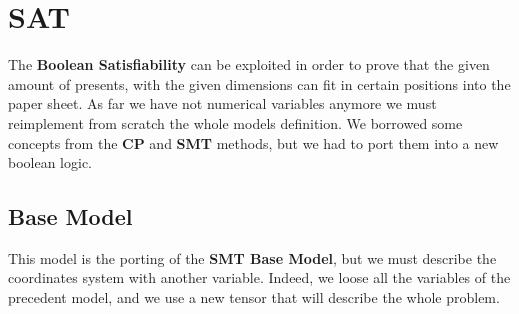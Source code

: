 \chapter{SAT}
The \textbf{Boolean Satisfiability} can be exploited in order to prove that the given amount of presents, with the given dimensions can
fit in certain positions into the paper sheet. As far we have not numerical variables anymore we must reimplement from scratch the whole
models definition. We borrowed some concepts from the \textbf{CP} and \textbf{SMT} methods, but we had to port them into a new boolean logic.

\section{Base Model}
This model is the porting of the \textbf{SMT Base Model}, but we must describe the coordinates system with another variable.
Indeed, we loose all the variables of the precedent model, and we use a new tensor that will describe the whole problem. 


